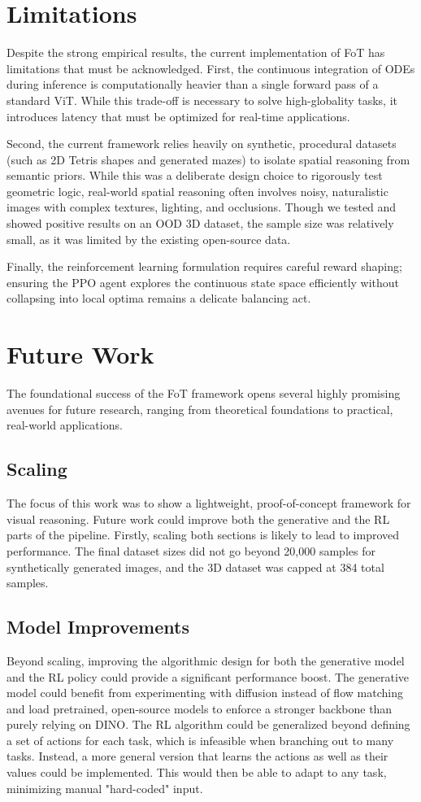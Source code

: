 \documentclass{l4proj}
\begin{document}
\section{Limitations}
Despite the strong empirical results, the current implementation of FoT has limitations that must be acknowledged. First, the continuous integration of ODEs during inference is computationally heavier than a single forward pass of a standard ViT. While this trade-off is necessary to solve high-globality tasks, it introduces latency that must be optimized for real-time applications.

Second, the current framework relies heavily on synthetic, procedural datasets (such as 2D Tetris shapes and generated mazes) to isolate spatial reasoning from semantic priors. While this was a deliberate design choice to rigorously test geometric logic, real-world spatial reasoning often involves noisy, naturalistic images with complex textures, lighting, and occlusions. Though we tested and showed positive results on an OOD 3D dataset, the sample size was relatively small, as it was limited by the existing open-source data.

Finally, the reinforcement learning formulation requires careful reward shaping; ensuring the PPO agent explores the continuous state space efficiently without collapsing into local optima remains a delicate balancing act.

\section{Future Work}
The foundational success of the FoT framework opens several highly promising avenues for future research, ranging from theoretical foundations to practical, real-world applications.

\subsection{Scaling}
The focus of this work was to show a lightweight, proof-of-concept framework for visual reasoning. Future work could improve both the generative and the RL parts of the pipeline. Firstly, scaling both sections is likely to lead to improved performance. The final dataset sizes did not go beyond 20,000 samples for synthetically generated images, and the 3D dataset was capped at 384 total samples.

\subsection{Model Improvements}
Beyond scaling, improving the algorithmic design for both the generative model and the RL policy could provide a significant performance boost. The generative model could benefit from experimenting with diffusion instead of flow matching and load pretrained, open-source models to enforce a stronger backbone than purely relying on DINO. The RL algorithm could be generalized beyond defining a set of actions for each task, which is infeasible when branching out to many tasks. Instead, a more general version that learns the actions as well as their values could be implemented. This would then be able to adapt to any task, minimizing manual "hard-coded" input.
\end{document}
